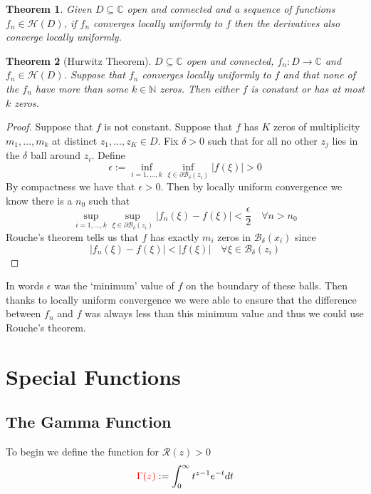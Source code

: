 \documentclass[11pt]{article}
\newcommand{\defeq}{:=}
\newcommand{\abs}[1]{\left|#1\right|}
\newcommand{\C}{\mathbb{C}}
\newcommand{\N}{\mathbb{N}}
\newenvironment{defin}
	{\begin{mdframed}[backgroundcolor=white, roundcorner=5pt, linewidth=1pt]}
	{\end{mdframed}}
\newcommand{\mdf}[1]{{\color{red} #1}}
\newtheorem{theorem}{Theorem}[section]
\begin{document}
\begin{theorem}
Given $D\subseteq\C$ open and connected and a sequence of functions $f_n\in\mathcal{H}(D)$, if $f_n$ converges locally uniformly to $f$ then the derivatives also converge locally uniformly.
\end{theorem}

\begin{theorem}[Hurwitz Theorem]
$D\subseteq\C$ open and connected, $f_n:D\to\C$ and $f_n\in\mathcal{H}(D)$.
Suppose that $f_n$ converges locally uniformly to $f$ and that none of the $f_n$ have more than some $k\in\N$ zeros.
Then either $f$ is constant or has at most $k$ zeros.
\end{theorem}

\begin{proof}
Suppose that $f$ is not constant.
Suppose that $f$ has $K$ zeros of multiplicity $m_1, \dots, m_k$ at distinct $z_1, \dots, z_K\in D$.
Fix $\delta >0$ such that for all no other $z_j$ lies in the $\delta$ ball around $z_i$.
Define
\[
	\epsilon\defeq\inf_{i=1, \dots, k}\inf_{\xi\in\partial\mathcal{B}_\delta(z_i)}\abs{f(\xi)} >0
\]
By compactness we have that $\epsilon >0$.
Then by locally uniform convergence we know there is a $n_0$ such that
\[
	\sup_{i=1, \dots, k}\sup_{\xi\in\partial\mathcal{B}_\delta(z_i)}\abs{f_n(\xi)-f(\xi)} < \frac{\epsilon}{2}\quad\forall n> n_0
\]
Rouche's theorem tells us that $f$ has exactly $m_i$ zeros in $\mathcal{B}_\delta(x_i)$ since
\[
	\abs{f_n(\xi)-f(\xi)} < \abs{f(\xi)} \quad \forall\xi\in\mathcal{B}_\delta(z_i)
\]
\end{proof}

In words $\epsilon$ was the `minimum' value of $f$ on the boundary of these balls.
Then thanks to locally uniform convergence we were able to ensure that the difference between $f_n$ and $f$ was always less than this minimum value and thus we could use Rouche's theorem.

\section{Special Functions}

\subsection{The Gamma Function}
\begin{defin}
	To begin we define the function for $\mathcal{R}(z)> 0$
	\[
		\mdf{\Gamma(z)}\defeq\int_0^\infty t^{z-1}e^{-t}dt
	\]
\end{defin}
\end{document}
